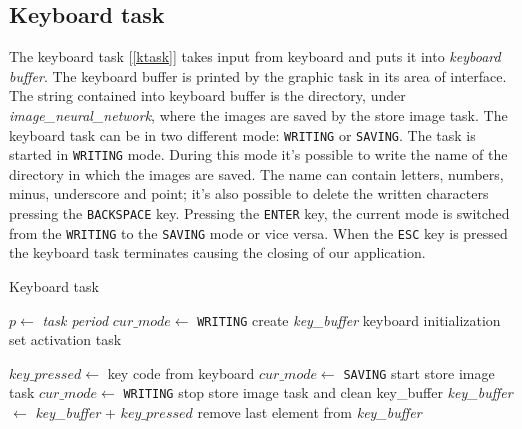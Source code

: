 \documentclass[12pt]{article}
\begin{document}
\subsection{Keyboard task}
The keyboard task [\ref{ktask}] takes input from keyboard and puts it into
\textit{keyboard buffer}. The keyboard buffer is printed by the graphic task
in its area of interface. The string contained into keyboard buffer is the
directory, under \textit{image\_neural\_network}, where the images are saved
by the store image task. The keyboard task can be in two different mode:
\texttt{WRITING} or \texttt{SAVING}. The task is started in \texttt{WRITING}
mode. During this mode it's possible to write the name of the directory in
which the images are saved. The name can contain letters, numbers, minus,
underscore and point; it's also possible to delete the written characters
pressing the \texttt{BACKSPACE} key. Pressing the \texttt{ENTER} key, the
current mode is switched from the \texttt{WRITING} to the \texttt{SAVING}
mode or vice versa. When the \texttt{ESC} key is pressed the keyboard task
terminates causing the closing of our application.

\begin{algorithm}[H]
\caption{Keyboard task}
\label{ktask}

\begin{algorithmic}
\State $p\gets$ \textit{task period}
\State $cur\_mode\gets$ \texttt{WRITING}
\State create \textit{key\_buffer}
\State keyboard initialization
\State set activation task

\Repeat
\State $key\_pressed\gets$ key code from keyboard
    \State $cur\_mode\gets$ \texttt{SAVING}
    \State start store image task
    \Else
    \State $cur\_mode\gets$ \texttt{WRITING}
    \State stop store image task and clean key\_buffer
    \EndIf
{}
        \State \textit{key\_buffer} $\gets$ \textit{key\_buffer} + $key\_pressed$ 
        \State remove last element from \textit{key\_buffer}
    \EndIf
\EndIf


\end{algorithmic}
\end{algorithm}
\end{document}
